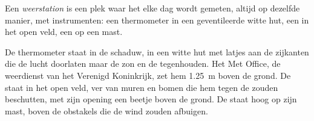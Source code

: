 \begin{definition}[Weerstation]\label{def:g4:clouds-rain-snow:weather-station}
Een \emph{weerstation} is een plek waar het  elke dag
wordt gemeten, altijd op dezelfde manier, met instrumenten: een thermometer
in een geventileerde witte hut, een  in het open veld, een
 op een mast.
\end{definition}

De thermometer staat in de schaduw, in een witte hut met latjes aan de
zijkanten die de lucht doorlaten maar de zon en de  tegenhouden. Het
Met Office, de weerdienst van het Verenigd Koninkrijk, zet hem
\SI{1.25}{\metre} boven de grond. De  staat in het open veld, ver
van muren en bomen die hem tegen de  zouden beschutten, met zijn
opening een beetje boven de grond. De  staat hoog op zijn mast,
boven de obstakels die de wind zouden afbuigen.


